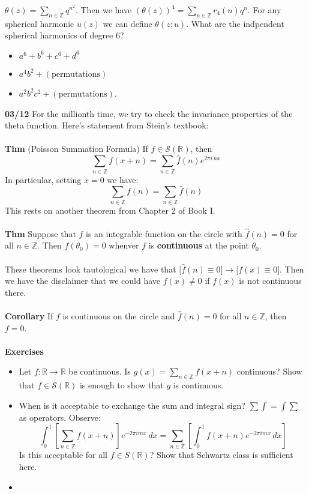 \documentclass[12pt]{article}
\begin{document}
\newpage

\noindent $\theta(z) = \sum_{n \in \mathbb{Z}} q^{n^2}$.  Then we have $(\theta(z))^4 = \sum_{n \in \mathbb{Z}} r_4(n) q^n $.  For any spherical harmonic $u(z)$ we can define $\theta(z;u)$.  What are the indpendent spherical harmonics of degree $6$?
\begin{itemize}
\item $a^6 + b^6 + c^6 + d^6$
\item $a^4 b^2 + (\text{permutations})$
\item $a^2 b^2 c^2 + (\text{permutations})$.
\end{itemize}
\textbf{03/12} For the millionth time, we try to check the invariance properties of the theta function.  Here's statement from Stein's textbook:\\ \\
\textbf{Thm} (Poisson Summation Formula) If $f \in \mathcal{S}(\mathbb{R})$, then
$$ \sum_{n \in \mathbb{Z}} f(x+n) = \sum_{n \in \mathbb{Z}} \hat{f}(n) e^{2\pi i \, n x} $$
In particular, setting $x = 0$ we have:
$$ \sum_{n \in \mathbb{Z}} f(n) = \sum_{n \in \mathbb{Z}} \hat{f}(n) $$
This rests on another theorem from Chapter 2 of Book I. \\ \\ 
\textbf{Thm} Suppose that $f$ is an integrable function on the circle with $\hat{f}(n) = 0$ for all $n \in \mathbb{Z}$.  Then $f(\theta_0) = 0$ whenver $f$ is {\color{green!50!blue!90!black}\textbf{continuous}} at the point $\theta_0$.  \\ \\
These theorems look tautological we have that $\big[\hat{f}(n) \equiv 0\big] \to \big[f(x) \equiv 0\big]$.  Then we have the disclaimer that we could have $f(x) \neq 0$ if $f(x)$ is not continuous there. \\ \\
\textbf{Corollary} If $f$ is continuous on the circle and $\hat{f}(n) = 0$ for all $n \in \mathbb{Z}$, then $f = 0$. \\ \\
\textbf{Exercises}
\begin{itemize}
\item Let $f: \mathbb{R} \to \mathbb{R}$ be continuous.  Is $\displaystyle g(x) = \sum_{n \in \mathbb{Z}} f(x+n)$ continuous? Show that $f \in \mathcal{S}(\mathbb{R})$ is enough to show that $g$ is continuous.
\item When is it acceptable to exchange the sum and integral sign?  $\sum \int = \int \sum $ as operators.  Observe:
$$ \int_0^1 \left[ \sum_{n \in \mathbb{Z}}  f(x+n) \right]e^{-2\pi i mx} \, dx = 
\sum_{n \in \mathbb{Z}} \left[ \int_0^1 f(x+n) e^{-2\pi i m x} \, dx \right] $$
Is this acceptable for all $f \in S(\mathbb{R})$? Show that Schwartz class is sufficient  here. 
\item  
\end{itemize}
\end{document}
